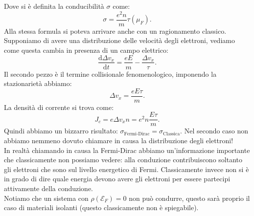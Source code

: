 Dove si è definita la conducibilità $\sigma $ come:
\[
	\sigma 
	=
	\frac{e^2 n }{m}\tau ( \mu_F)  
.\] 
Alla stessa formula si poteva arrivare anche con un ragionamento classico. Supponiamo di avere una distribuzione delle velocità degli elettroni, vediamo come questa cambia in presenza di un campo elettrico:
\[
	\frac{\mbox{d} \Delta v_x}{\mbox{d} t} = \frac{eE}{m}-\frac{\Delta v_x}{\tau}
.\] 
Il secondo pezzo è il termine collisionale fenomenologico, imponendo la stazionarietà abbiamo:
\[
	\Delta v_x 
	=
	\frac{eE\tau }{m}
.\] 
La densità di corrente si trova come:
\[
	J_c
	=
	e \Delta v_x n = e^2n \frac{E \tau }{m}
.\] 
Quindi abbiamo un bizzarro risultato: $\sigma _\text{Fermi-Dirac} = \sigma _\text{Classica} $. Nel secondo caso non abbiamo nemmeno dovuto chiamare in causa la distribuzione degli elettroni!\\
In realtà chiamando in causa la Fermi-Dirac abbiamo un'informazione importante che classicamente non possiamo vedere: alla conduzione contribuiscono soltanto gli elettroni che sono sul livello energetico di Fermi. Classicamente invece non si è in grado di dire quale energia devono avere gli elettroni per essere partecipi attivamente della conduzione.\\
Notiamo che un sistema con $\rho ( \mathcal{E}_F) = 0 $ non può condurre, questo sarà proprio il caso di materiali isolanti (questo classicamente non è spiegabile).
